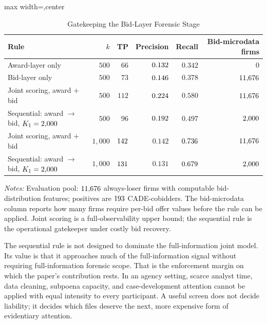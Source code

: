 \begin{table}[htbp]
\centering
\caption{Gatekeeping the Bid-Layer Forensic Stage}
\label{tab:gatekeeper_submission}
\footnotesize
\begin{adjustbox}{max width=\textwidth,center}
\begin{threeparttable}
\begin{tabular}{p{5.2cm}rrrrr}
\toprule
Rule & $k$ & TP & Precision & Recall & Bid-microdata firms \\
\midrule
Award-layer only & $500$ & $66$ & $0.132$ & $0.342$ & $0$ \\
Bid-layer only & $500$ & $73$ & $0.146$ & $0.378$ & $11{,}676$ \\
Joint scoring, award $+$ bid & $500$ & $112$ & $0.224$ & $0.580$ & $11{,}676$ \\
Sequential: award $\rightarrow$ bid, $K_1=2{,}000$
& $500$ & $96$ & $0.192$ & $0.497$ & $2{,}000$ \\
\midrule
Joint scoring, award $+$ bid & $1{,}000$ & $142$
& $0.142$ & $0.736$ & $11{,}676$ \\
Sequential: award $\rightarrow$ bid, $K_1=2{,}000$
& $1{,}000$ & $131$
& $0.131$ & $0.679$ & $2{,}000$ \\
\bottomrule
\end{tabular}
\begin{tablenotes}
\footnotesize
\item \textit{Notes:} Evaluation pool:
$11{,}676$ always-loser firms with computable
bid-distribution features; positives are $193$
CADE-cobidders. The bid-microdata column reports how many firms
require per-bid offer values before the rule can be applied.
Joint scoring is a full-observability upper bound; the sequential
rule is the operational gatekeeper under costly bid recovery.
\end{tablenotes}
\end{threeparttable}
\end{adjustbox}
\end{table}

The sequential rule is not designed to dominate the full-information
joint model. Its value is that it approaches much of the
full-information signal without requiring full-information
forensic scope. That is the enforcement margin on which the
paper's contribution rests. In an agency setting, scarce analyst
time, data cleaning, subpoena capacity, and case-development
attention cannot be applied with equal intensity to every
participant. A useful screen does not decide liability; it
decides which files deserve the next, more expensive form of
evidentiary attention.

